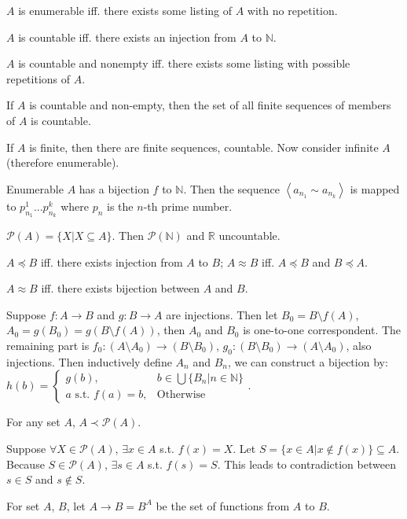 \documentclass{article}
\newcommand \mlist[1]				{\left\langle #1 \right\rangle}
\newcommand \power[1]				{\mathcal{P}\left( #1 \right)}
\begin{document}
\Thm {}
	$A$ is enumerable iff. there exists some listing of $A$ with no repetition.

\Thm {}
	$A$ is countable iff. there exists an injection from $A$ to $\mathbb{N}$.

\Thm {}
	$A$ is countable and nonempty iff. there exists some listing with possible repetitions of $A$.

\Thm {}
	If $A$ is countable and non-empty, then the set of all finite sequences of members of $A$ is countable.

\Proof
	If $A$ is finite, then there are finite sequences, countable. Now consider infinite $A$ (therefore enumerable).
	
	Enumerable $A$ has a bijection $f$ to $\mathbb{N}$. Then the sequence $\mlist{a_{n_1}\sim a_{n_k}}$ is mapped to $p_{n_1}^{1}...p_{n_k}^{k}$ where $p_n$ is the $n$-th prime number.

	$\power{A} = \{ X| X \subseteq A\}$. Then $\power{\mathbb{N}}$ and $\mathbb{R}$ uncountable.

	$A \preceq B$ iff. there exists injection from $A$ to $B$; $A \approx B$ iff. $A \preceq B$ and $B \preceq A$.

	$A \approx B$ iff. there exists bijection between $A$ and $B$.

\Proof
	Suppose $f:A\to B$ and $g:B\to A$ are injections. Then let $B_0=B \setminus f(A)$, $A_0=g(B_0)=g(B \setminus f(A))$, then $A_0$ and $B_0$ is one-to-one correspondent. The remaining part is $f_0:(A \setminus A_0)\to (B \setminus B_0)$, $g_0:(B \setminus B_0)\to (A \setminus A_0)$, also injections. Then inductively define $A_n$ and $B_n$, we can construct a bijection by: $h(b)=\begin{cases}g(b), & b \in \bigcup \{B_n|n\in\mathbb{N}\} \\ a \text{ s.t. } f(a)=b, & \text{Otherwise}\end{cases}$.

	For any set $A$, $A \prec \power{A}$.

\Proof
	Suppose $\forall X \in \power{A}$, $\exists x \in A$ s.t. $f(x) = X$. Let $S=\{x\in A| x \not\in f(x)\} \subseteq A$. Because $S \in \power{A}$, $\exists s\in A$ s.t. $f(s)=S$. This leads to contradiction between $s\in S$ and $s \not\in S$.

	For set $A$, $B$, let $A\to B=B^A$ be the set of functions from $A$ to $B$.
\end{document}
